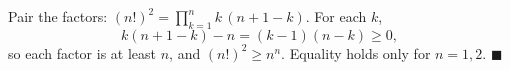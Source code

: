 Pair the factors: $(n!)^2=\displaystyle\prod_{k=1}^{n}k\,(n+1-k)$. For each $k$,
\[k(n+1-k)-n=(k-1)(n-k)\ge0,\]
so each factor is at least $n$, and $(n!)^2\ge n^n$. Equality holds only for $n=1,2$. $\blacksquare$
